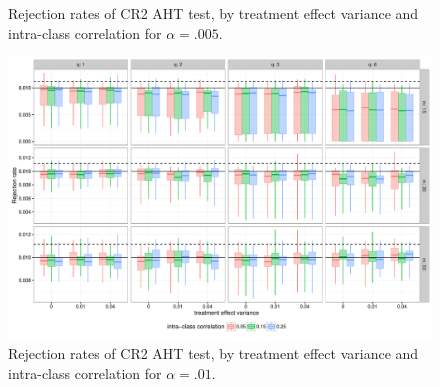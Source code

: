 \documentclass{article}\usepackage[]{graphicx}\usepackage[]{color}
\newenvironment{knitrout}{}{} %
\begin{document}
\begin{landscape}
\begin{knitrout}
\begin{figure}[H]
{}

\caption[Rejection rates of CR2 AHT test, by treatment effect variance and intra-class correlation for ]{Rejection rates of CR2 AHT test, by treatment effect variance and intra-class correlation for $\alpha = .005$.}\label{fig:misspecification_005}
\end{figure}


\end{knitrout}

\begin{knitrout}
\color{fgcolor}\begin{figure}[H]

{\centering \includegraphics[width=\linewidth]{CR_fig/misspecification_01-1} 

}

\caption[Rejection rates of CR2 AHT test, by treatment effect variance and intra-class correlation for ]{Rejection rates of CR2 AHT test, by treatment effect variance and intra-class correlation for $\alpha = .01$.}\label{fig:misspecification_01}
\end{figure}


\end{knitrout}

\begin{knitrout}
\color{fgcolor}\begin{figure}[H]


\end{figure}
\end{knitrout}
\end{landscape}
\end{document}
